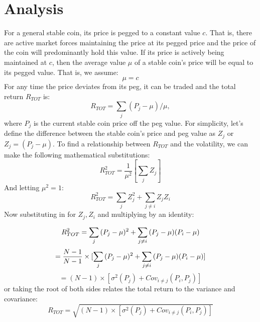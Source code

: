 \section{Analysis}



For a general stable coin, its price is pegged to a constant value $c$.  That is, there are active market forces maintaining the price at its pegged price and the price of the coin will predominantly hold this value.  If its price is actively being maintained at $c$, then the average value ${\mu}$ of a stable coin's price will be equal to its pegged value.   That is, we assume:
\begin{equation}
    \mu = c
\end{equation}
For any time the price deviates from its peg, it can be traded and the total return $R_{TOT}$ is:
\begin{equation}
    R_{TOT} = \sum\limits_{j}{(P_{j} - \mu)/\mu},
\end{equation}
where $P_{j}$ is the current stable coin price off the peg value.  For simplicity, let's define the difference between the stable coin's price and peg value as $Z_{j}$ or $Z_{j} = (P_{j}-\mu)$.
To find a relationship between $R_{TOT}$ and the volatility, we can make the following mathematical substitutions:
\begin{equation}
    R_{TOT}^2 = \frac{1}{\mu^2}[\sum_j{Z_j}]
\end{equation}
And letting $\mu^2 = 1$:
\begin{equation}
    R_{TOT}^2 = \sum_j{Z_j^2} + \sum\limits_{j\neq i}{Z_j Z_i}
\end{equation}
Now substituting in for $Z_j , Z_i$ and multiplying by an identity:

\begin{equation}
   R_{TOT}^2 = \sum_j{(P_{j}-\mu)^2} + \sum\limits_{j\neq i}{(P_{j}-\mu) (P_{i}-\mu)} \notag
\end{equation}
\begin{equation}
        = \frac{N-1}{N-1} \times [\sum\limits_{j}{(P_{j}-\mu)^2} + \sum\limits_{j\neq i}{(P_{j}-\mu) (P_{i}-\mu)}] \notag
\end{equation}
\begin{equation}
    = (N-1) \times [\sigma^2(P_j) + Cov_{i \neq j}(P_i,P_j)] 
\end{equation}
or taking the root of both sides relates the total return to the variance and covariance:
\begin{equation}
  \boxed{R_{TOT}=\sqrt{(N-1) \times [\sigma^2(P_j) + Cov_{i \neq j}(P_i,P_j)]}}
\end{equation}



